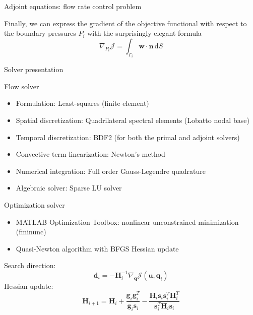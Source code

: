 \documentclass{beamer}
\begin{document}
\begin{frame}{Adjoint equations: flow rate control problem}

	Finally, we can express the gradient of the objective functional with respect to the boundary pressures $P_{i}$ with the surprisingly elegant formula
	\begin{equation}
		\nabla_{P_{i}}\mathcal{J}=\int_{\Gamma_{i}}\mathbf{w}\cdot\mathbf{n}\,\mathrm{d}S
	\end{equation}

\end{frame}

\begin{frame}[standout]
    Solver presentation
\end{frame}

\begin{frame}{Flow solver}
	
	\begin{itemize}
		\setlength\itemsep{1em}
		\item \alert{Formulation:} Least-squares (finite element)
		\item \alert{Spatial discretization:} Quadrilateral spectral elements (Lobatto nodal base)
		\item \alert{Temporal discretization:} BDF2 (for both the primal and adjoint solvers)
		\item \alert{Convective term linearization:} Newton's method
		\item \alert{Numerical integration:} Full order Gauss-Legendre quadrature
		\item \alert{Algebraic solver:} Sparse LU solver
	\end{itemize}
	
\end{frame}

\begin{frame}{Optimization solver}
	
	\begin{itemize}
		\item MATLAB Optimization Toolbox: nonlinear unconstrained minimization (fminunc)
		\item Quasi-Newton algorithm with BFGS Hessian update		
	\end{itemize}
	Search direction:
	\begin{equation*}
		\mathbf{d}_{i}=-\mathbf{H}_{i}^{-1}\nabla_{\mathbf{q}}\mathcal{J}\left(\mathbf{u},\mathbf{q}_{i}\right)
	\end{equation*}
	Hessian update:
	\begin{equation*}
		\mathbf{H}_{i+1}=\mathbf{H}_{i}+\frac{\mathbf{g}_{i}\mathbf{g}_{i}^{T}}{\mathbf{g}_{i}\mathbf{s}_{i}}-\frac{\mathbf{H}_{i}\mathbf{s}_{i}\mathbf{s}_{i}^{T}\mathbf{H}_{i}^{T}}{\mathbf{s}_{i}^{T}\mathbf{H}_{i}\mathbf{s}_{i}}
	\end{equation*}
	
\end{frame}
\end{document}
